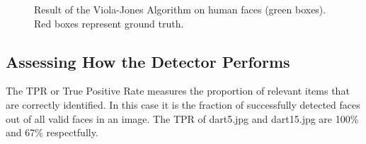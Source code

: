 \documentclass[a4paper]{article}
\begin{document}
\begin{figure}[H]
  \centering
  \hfill
   \hfill
   \hfill
   \hfill
   \hfill
   \caption{Result of the Viola-Jones Algorithm on human faces (green boxes). Red boxes represent ground truth.}
\end{figure}

\subsection*{Assessing How the Detector Performs}
\vspace{-0.7em}

The TPR or True Positive Rate measures the proportion of relevant items that
are correctly identified. In this case it is the fraction of successfully
detected faces out of all valid faces in an image. The TPR of dart5.jpg and
dart15.jpg are 100\% and 67\% respectfully.
\end{document}

